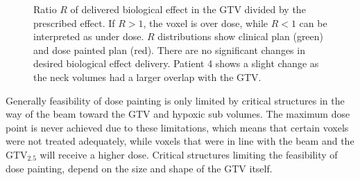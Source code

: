 \begin{sidewaysfigure}[p]
\centering
{}
\caption{Ratio $R$ of delivered biological effect in the GTV divided by the prescribed effect. If $R>1$, the voxel is over dose, while $R<1$ can be interpreted as under dose. $R$ distributions show clinical plan (green) and dose painted plan (red). There are no significant changes in desired biological effect delivery. Patient 4 shows a slight change as the neck volumes had a larger overlap with the GTV.}
\label{fig:R}
\end{sidewaysfigure}
Generally feasibility of dose painting is only limited by critical structures in the way of the beam toward the GTV and hypoxic sub volumes. The maximum dose point is never achieved due to these limitations, which means that certain voxels were not treated adequately, while voxels that were in line with the beam and the GTV$_{2.5}$ will receive a higher dose. Critical structures limiting the feasibility of dose painting, depend on the size and shape of the GTV itself.
